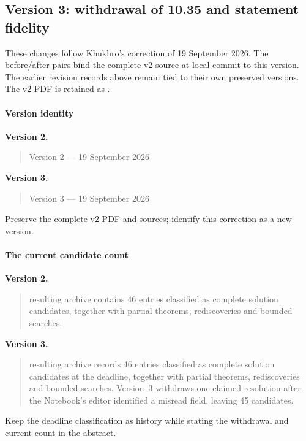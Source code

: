 \subsection{Version 3: withdrawal of 10.35 and statement fidelity}
\label{sec:v3-changes}
These changes follow Khukhro's correction of 19 September 2026.
The before/after pairs bind the complete v2 source at local commit
 to this version. The earlier revision records above
remain tied to their own preserved versions. The v2 PDF is retained as
.

\paragraph{Version identity}

\noindent\textbf{Version 2.}
\begin{quote}\small
Version 2 --- 19 September 2026
\end{quote}

\noindent\textbf{Version 3.}
\begin{quote}\small
Version 3 --- 19 September 2026
\end{quote}

Preserve the complete v2 PDF and sources; identify this correction as a new version.

\paragraph{The current candidate count}

\noindent\textbf{Version 2.}
\begin{quote}\small
resulting archive contains 46 entries classified as complete solution
candidates, together with partial theorems, rediscoveries and bounded
searches.
\end{quote}

\noindent\textbf{Version 3.}
\begin{quote}\small
resulting archive records 46 entries classified as complete solution
candidates at the deadline, together with partial theorems, rediscoveries
and bounded searches. Version~3 withdraws one claimed resolution after
the Notebook's editor identified a misread field, leaving 45 candidates.
\end{quote}

Keep the deadline classification as history while stating the withdrawal and current count in the abstract.


